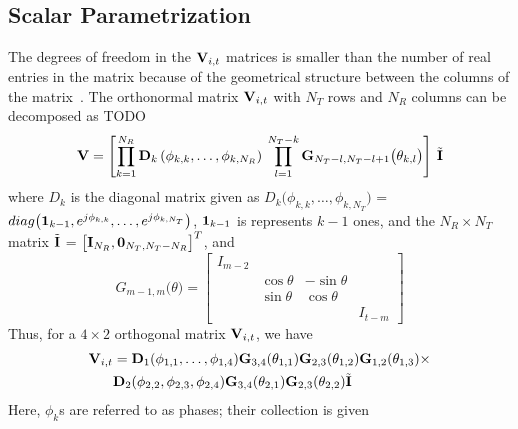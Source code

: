 \documentclass[conference]{IEEEtran}
\begin{document}


\subsection{Scalar Parametrization}
\label{givens}
The degrees of freedom in the $\bV_{i,t}$ matrices is smaller than the
number of real entries in the matrix because of the geometrical
structure between the columns of the matrix~\cite{4114278}. The
orthonormal matrix $\bV_{i,t}$ with $N_T$ rows and $N_R$ columns can be
decomposed as TODO
\begin{equation}
\textbf{V} = \left[\prod_{k=1}^{N_{R}} \bD_{k} \left( \phi_{k,k},\ldots , \phi_{k,N_{R}} \right) \:  \prod_{l=1}^{N_{T}-k} \bG_{N_{T}-l,N_{T} -l+1} \big( \theta_{k,l}\big)  \right] \: \tilde{\bI}
\end{equation}
where $D_{k}$ is the diagonal matrix given as $D_{k}\big(\phi_{k,k},
\ldots, \phi_{k,N_T } \big)$ =  $\mbox{diag}\big( {\bf 1}_{k-1},
e^{j\phi_{k,k}},\ldots, e^{j\phi_{k,N_T }}  \big)$, ${\bf 1}_{k-1}$ is
represents  $k-1$ ones, and the $N_R \times N_T$ matrix $\tilde{\bI}$
= $\big[\bI_{N_R }, {\bf 0}_{N_T ,N_T -N_R }\big]^{T}$, and
\begin{equation}
G_{m-1,m}\big(\theta\big)  =
\begin{bmatrix}
I_{m-2} & & & \\
& \cos\theta & -\sin\theta & \\
& \sin\theta & \cos\theta & \\
& & & I_{t-m}
\end{bmatrix}
\end{equation}
Thus, for a $4 \times 2$ orthogonal matrix $\bV_{i,t}$, we have
\begin{align*}
  \bV_{i,t} & =
  \bD_{1}(\phi_{1,1},\ldots,\phi_{1,4})\bG_{3,4}(\theta_{1,1})
  \bG_{2,3}(\theta_{1,2}) \bG_{1,2}(\theta_{1,3})\times\\
& \bD_{2}(\phi_{2,2},\phi_{2,3},\phi_{2,4}) \bG_{3,4}(\theta_{2,1}) \bG_{2,3}(\theta_{2,2})\tilde{\bI}
\end{align*}
Here, $\phi_{k}$s are referred to as phases; their collection is given
\end{document}
